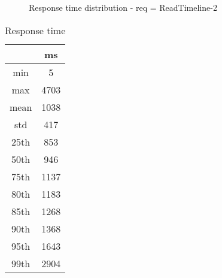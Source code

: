 \begin{minipage}{0.75\linewidth}
\begin{figure}[h]
\begin{adjustbox}{max width=1.0\linewidth, keepaspectratio}
  \end{adjustbox}
  \caption{Response time distribution - req = ReadTimeline-2}
\end{figure}
\end{minipage}\hfill\begin{minipage}{0.18\linewidth}
\begin{table}[h]
\begin{tabular}{|cc|}
\hline
\textbf{} & \textbf{ms}\\ \hline
 \Xhline{0.005\arrayrulewidth}
min & 5\\
 \Xhline{0.005\arrayrulewidth}
max & 4703\\
 \Xhline{0.005\arrayrulewidth}
mean & 1038\\
 \Xhline{0.005\arrayrulewidth}
std & 417\\
\hline
\hline
 \Xhline{0.005\arrayrulewidth}
25th & 853\\
 \Xhline{0.005\arrayrulewidth}
50th & 946\\
 \Xhline{0.005\arrayrulewidth}
75th & 1137\\
 \Xhline{0.005\arrayrulewidth}
80th & 1183\\
 \Xhline{0.005\arrayrulewidth}
85th & 1268\\
 \Xhline{0.005\arrayrulewidth}
90th & 1368\\
 \Xhline{0.005\arrayrulewidth}
95th & 1643\\
 \Xhline{0.005\arrayrulewidth}
99th & 2904\\
\hline
\end{tabular}
\caption{Response time}
\end{table}
\end{minipage}\hfill